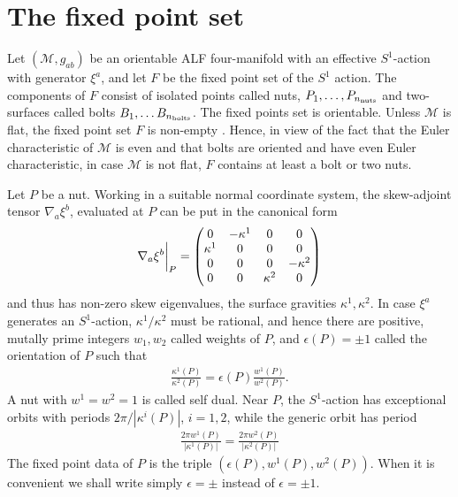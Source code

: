 \documentclass[a4paper,10pt,reqno]{amsart}
\newcommand{\nut}{P}
\newcommand{\bolt}{B}
\newcommand{\cM}{\mathcal{M}}
\theoremstyle{plain}
\newcommand{\nnuts}{n_{\text{\rm nuts}}}
\newcommand{\nbolts}{n_{\text{\rm bolts}}}
\numberwithin{equation}{section}
\newcommand{\eps}{\epsilon}
\newcommand{\Fixed}{F}
\begin{document}
\section{The fixed point set}
\label{sec:S1ALF} 
Let $(\cM, g_{ab})$ be an orientable ALF  four-manifold with an effective $S^1$-action with generator $\xi^a$, and let $\Fixed$ be the fixed point set of the $S^1$ action.  The components of $\Fixed$ consist of isolated points called nuts, $\nut_1, \dots, \nut_{\nnuts}$ and two-surfaces called  bolts $\bolt_1, \dots \bolt_{\nbolts}$.  The fixed points set is orientable. 
Unless $\cM$  is flat, the fixed point set $\Fixed$ is non-empty \cite{MR3973911}. Hence, in view of the fact that the Euler characteristic of $\cM$ is even and that bolts are oriented and have even Euler characteristic,  in case $\cM$ is not flat, $\Fixed$ contains at least a bolt or two nuts. 

Let $\nut$ be a nut. Working in a suitable normal coordinate system, the skew-adjoint tensor $\nabla_a \xi^b$, 
evaluated at $\nut$ can be put in the canonical form  
\begin{align} \label{eq:nablaxi(nut)}
\nabla_a \xi^b \bigg{|}_{\nut} = \begin{pmatrix}0&-\kappa^1&0&0\\\kappa^1&0&0&0\\0&0&0&-\kappa^2\\0&0&\kappa^2&0\end{pmatrix}
\end{align} 
and thus has non-zero skew eigenvalues, the surface gravities $\kappa^1, \kappa^2$.  
In case $\xi^a$ generates an $S^1$-action, $\kappa^1/\kappa^2$ must be rational, and hence there are  positive, mutally prime integers $w_1, w_2$ called weights of $\nut$, and $\eps(\nut) = \pm 1$ called the orientation of $\nut$ such that    
\begin{align} 
\frac{\kappa^1(\nut)}{\kappa^2(\nut)} = \eps(\nut) \frac{w^1(\nut)}{w^2(\nut)} .
\end{align} 
A nut with $w^1=w^2=1$ is called self dual. 
Near $\nut$, the $S^1$-action has exceptional orbits with periods $2\pi/|\kappa^i(\nut)|$, $i=1,2$, while the generic orbit has period 
\begin{align} 
\frac{2\pi w^1(\nut)}{|\kappa^1(\nut)|} = \frac{2 \pi w^2(\nut)}{|\kappa^2(\nut)|}
\end{align}  
The fixed point data of $\nut$ is the triple $(\eps(\nut), w^1(\nut), w^2(\nut))$. When it is convenient we shall write simply $\eps=\pm$ instead of $\eps=\pm 1$. 
\end{document}
